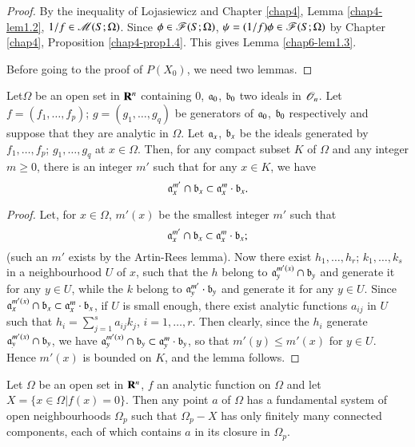 \begin{proof}
By the inequality of Lojasiewicz and Chapter \ref{chap4}, Lemma \ref{chap4-lem1.2}, $1/f\in \mathscr{M}(S;\Omega)$. Since $\phi\in \mathscr{F}(S;\Omega)$, $\psi=(1/f)\phi\in\mathscr{F}(S;\Omega)$ by Chapter \ref{chap4}, Proposition \ref{chap4-prop1.4}. This gives Lemma \ref{chap6-lem1.3}.

Before going to the proof of $P(X_{0})$, we need two lemmas.
\end{proof}

\begin{lemma}\label{chap6-lem1.4}
Let\pageoriginale $\Omega$ be an open set in $\mathbf{R}^{n}$ containing $0$, $\mathfrak{a}_{0}$, $\mathfrak{b}_{0}$ two ideals in $\mathscr{O}_{n}$. Let $f=(f_{1},\ldots,f_{p})$; $g=(g_{1},\ldots,g_{q})$ be generators of $\mathfrak{a}_{0}$, $\mathfrak{b}_{0}$ respectively and suppose that they are analytic in $\Omega$. Let $\mathfrak{a}_{x}$, $\mathfrak{b}_{x}$ be the ideals generated by $f_{1},\ldots,f_{p}$; $g_{1},\ldots,g_{q}$ at $x\in \Omega$. Then, for any compact subset $K$ of $\Omega$ and any integer $m\geq 0$, there is an integer $m'$ such that for any $x\in K$, we have
$$
\mathfrak{a}^{m'}_{x}\cap \mathfrak{b}_{x}\subset \mathfrak{a}^{m}_{x}\cdot \mathfrak{b}_{x}.
$$
\end{lemma}

\begin{proof}
Let, for $x\in \Omega$, $m'(x)$ be the smallest integer $m'$ such that
$$
\mathfrak{a}^{m'}_{x}\cap \mathfrak{b}_{x}\subset \mathfrak{a}^{m}_{x}\cdot \mathfrak{b}_{x};
$$
(such an $m'$ exists by the Artin-Rees lemma). Now there exist $h_{1},\ldots,h_{r}$; $k_{1},\ldots,k_{s}$ in a neighbourhood $U$ of $x$, such that the $h$ belong to $\mathfrak{a}^{m'(x)}_{y}\cap \mathfrak{b}_{y}$ and generate it for any $y\in U$, while the $k$ belong to $\mathfrak{a}^{m'}_{y}\cdot \mathfrak{b}_{y}$ and generate it for any $y\in U$. Since $\mathfrak{a}^{m'(x)}_{x}\cap \mathfrak{b}_{x}\subset \mathfrak{a}^{m}_{x}\cdot \mathfrak{b}_{x}$, if $U$ is small enough, there exist analytic functions $a_{ij}$ in $U$ such that $h_{i}=\sum\limits^{s}_{j=1}a_{ij}k_{j}$, $i=1,\ldots,r$. Then clearly, since the $h_{i}$ generate $\mathfrak{a}^{m'(x)}_{y}\cap \mathfrak{b}_{y}$, we have $\mathfrak{a}^{m'(x)}_{y}\cap \mathfrak{b}_{y}\subset \mathfrak{a}^{m}_{y}\cdot \mathfrak{b}_{y}$, so that $m'(y)\leq m'(x)$ for $y\in U$. Hence $m'(x)$ is bounded on $K$, and the lemma follows.
\end{proof}

\begin{lemma}\label{chap6-lem1.5}
Let $\Omega$ be an open set in $\mathbf{R}^{n}$, $f$ an analytic function on $\Omega$ and let $X=\{x\in \Omega | f(x)=0\}$. Then any point $a$ of $\Omega$ has a fundamental system of open neighbourhoods $\Omega_{p}$ such that $\Omega_{p}-X$ has only finitely many connected components, each of which contains $a$ in its closure in $\Omega_{p}$.
\end{lemma}


